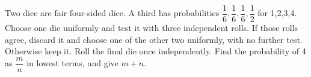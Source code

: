 Two dice are fair four-sided dice. A third has probabilities $\dfrac{1}{6},\dfrac{1}{6},\dfrac{1}{6},\dfrac{1}{2}$ for 1,2,3,4. Choose one die uniformly and test it with three independent rolls. If those rolls agree, discard it and choose one of the other two uniformly, with no further test. Otherwise keep it. Roll the final die once independently. Find the probability of 4 as $\dfrac{m}{n}$ in lowest terms, and give $m+n$.

